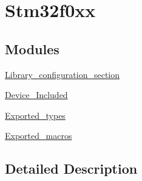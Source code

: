 \hypertarget{group__stm32f0xx}{}\section{Stm32f0xx}
\label{group__stm32f0xx}
\subsection*{Modules}
\begin{DoxyCompactItemize}
\item 
\hyperlink{group___library__configuration__section}{Library\+\_\+configuration\+\_\+section}
\item 
\hyperlink{group___device___included}{Device\+\_\+\+Included}
\item 
\hyperlink{group___exported__types}{Exported\+\_\+types}
\item 
\hyperlink{group___exported__macros}{Exported\+\_\+macros}
\end{DoxyCompactItemize}


\subsection{Detailed Description}
